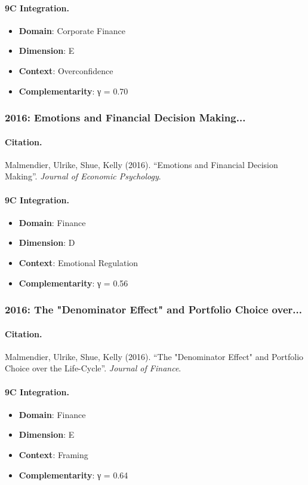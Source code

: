 \paragraph{9C Integration.}
\begin{itemize}[nosep]
  \item \textbf{Domain}: Corporate Finance
  \item \textbf{Dimension}: E
  \item \textbf{Context}: Overconfidence
  \item \textbf{Complementarity}: γ = 0.70
\end{itemize}


\subsubsection{2016: Emotions and Financial Decision Making...}

\paragraph{Citation.}
Malmendier, Ulrike, Shue, Kelly (2016). ``Emotions and Financial Decision Making''. \textit{Journal of Economic Psychology}.

\paragraph{9C Integration.}
\begin{itemize}[nosep]
  \item \textbf{Domain}: Finance
  \item \textbf{Dimension}: D
  \item \textbf{Context}: Emotional Regulation
  \item \textbf{Complementarity}: γ = 0.56
\end{itemize}


\subsubsection{2016: The "Denominator Effect" and Portfolio Choice over...}

\paragraph{Citation.}
Malmendier, Ulrike, Shue, Kelly (2016). ``The "Denominator Effect" and Portfolio Choice over the Life-Cycle''. \textit{Journal of Finance}.

\paragraph{9C Integration.}
\begin{itemize}[nosep]
  \item \textbf{Domain}: Finance
  \item \textbf{Dimension}: E
  \item \textbf{Context}: Framing
  \item \textbf{Complementarity}: γ = 0.64
\end{itemize}



